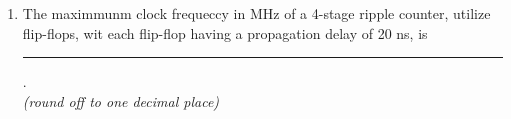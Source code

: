 \documentclass{article}
\begin{document}
\begin{enumerate}
	\item The maximmunm clock frequeccy in MHz of a 4-stage ripple counter, utilize flip-flops, wit each flip-flop having a propagation delay of 20 ns, is \rule{1.5cm}{0.15mm}.\\
\textit{(round off to one decimal place)}
\end{enumerate}
\end{document}

